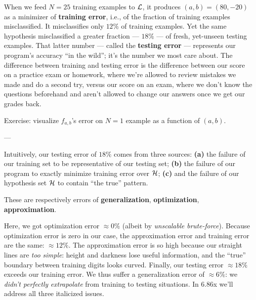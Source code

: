 \documentclass[11pt, justified]{tufte-book}
\newcommand{\attn}[1]{{\bro \textsf{#1}}}
\newcommand{\plainfootprint}{}
\newcommand{\footprint}{\marginnote{\plainfootprint} }
\newcommand{\samsubsubsection}[1]{
   \vspace{0.1cm}
   \par\noindent{\hspace{-2cm}\normalsize \sc \gre #1} ---
}
\theoremstyle{definition}
\begin{document}
        When we feed $N=25$ training examples to $\mathcal{L}$, it produces
        $(a,b)=(80,-20)$ as a minimizer of \textbf{training error}, i.e.,
        of the fraction of training examples misclassified.  It misclassifies
        only $12\%$ of training examples.\footprint Yet the same
        hypothesis misclassified a greater fraction --- $18\%$ --- of fresh,
        yet-unseen testing examples.
        That latter number --- called the \textbf{testing error} --- represents
        our program's accuracy ``in the wild'';
        it's the number we most care about.  The difference between training
        and testing error is the difference between our score on a practice
        exam or homework, where we're allowed to review mistakes we made and
        do a second try, versus our score on an exam, where we don't know the
        questions beforehand and aren't allowed to change our answers once we
        get our grades back.

        \noindent
        \attn{Exercise:} {visualize $f_{a,b}$'s error on $N=1$ example as a 
        function of $(a,b)$.}\footprint

      \samsubsubsection{error analysis}
        Intuitively, our testing error of $18\%$ comes from three sources:
        \textbf{(a)} the failure of our training set to be representative of our testing set; 
        \textbf{(b)} the failure of our program to exactly minimize training error over $\mathcal{H}$;
        \textbf{(c)} and the failure of our hypothesis set $\mathcal{H}$ to contain ``the true'' pattern. 

        These are respectively errors of
        \textbf{generalization},
        \textbf{optimization},
        \textbf{approximation}.

        Here, we got optimization error $\approx 0\%$ (albeit by
        \emph{unscalable brute-force}).  Because optimization error is zero in
        our case, the approximation error and training error are the same:
        $\approx12\%$.  The approximation error is so high because our straight
        lines are \emph{too simple}: height and darkness lose useful
        information, and the ``true'' boundary between training digits looks
        curved.\footprint
        Finally, our testing error $\approx 18\%$ exceeds our training error.
        We thus suffer a generalization error of $\approx 6\%$: we \emph{didn't
        perfectly extrapolate} from training to testing situations.
        In 6.86x we'll address all three italicized issues.
\end{document}
